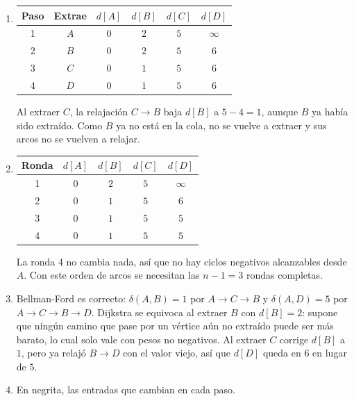 \ejercicio{}

\begin{enumerate}[label=(\alph*)]
  \item
  \begin{center}
    \begin{tabular}{|c|c|c|c|c|c|}
      \hline
      Paso & Extrae & $d[A]$ & $d[B]$ & $d[C]$ & $d[D]$ \\ \hline
      1 & $A$ & $0$ & $2$ & $5$ & $\infty$ \\ \hline
      2 & $B$ & $0$ & $2$ & $5$ & $6$ \\ \hline
      3 & $C$ & $0$ & $1$ & $5$ & $6$ \\ \hline
      4 & $D$ & $0$ & $1$ & $5$ & $6$ \\ \hline
    \end{tabular}
  \end{center}
  Al extraer $C$, la relajación $C \to B$ baja $d[B]$ a $5 - 4 = 1$, aunque $B$ ya había sido extraído. Como $B$ ya no está en la cola, no se vuelve a extraer y sus arcos no se vuelven a relajar.

  \item
  \begin{center}
    \begin{tabular}{|c|c|c|c|c|}
      \hline
      Ronda & $d[A]$ & $d[B]$ & $d[C]$ & $d[D]$ \\ \hline
      1 & $0$ & $2$ & $5$ & $\infty$ \\ \hline
      2 & $0$ & $1$ & $5$ & $6$ \\ \hline
      3 & $0$ & $1$ & $5$ & $5$ \\ \hline
      4 & $0$ & $1$ & $5$ & $5$ \\ \hline
    \end{tabular}
  \end{center}
  La ronda 4 no cambia nada, así que no hay ciclos negativos alcanzables desde $A$. Con este orden de arcos se necesitan las $n - 1 = 3$ rondas completas.

  \item Bellman-Ford es correcto: $\delta(A, B) = 1$ por $A \to C \to B$ y $\delta(A, D) = 5$ por $A \to C \to B \to D$. Dijkstra se equivoca al extraer $B$ con $d[B] = 2$: supone que ningún camino que pase por un vértice aún no extraído puede ser más barato, lo cual solo vale con pesos no negativos. Al extraer $C$ corrige $d[B]$ a $1$, pero ya relajó $B \to D$ con el valor viejo, así que $d[D]$ queda en $6$ en lugar de $5$.

  \item En negrita, las entradas que cambian en cada paso.
  \begin{center}
    \hspace{1cm}


\end{center}
\end{enumerate}
